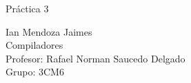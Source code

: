 \documentclass[12pt]{article}
\title{}
\author{Ian Mendoza Jaimes}
\date{}
\begin{document}
\begin{titlepage}
\centering
	\vspace*{1.5in}
	\begin{huge}
		Práctica 3\\
	\end{huge}
	\vspace{4em}
	\begin{Large}
		Ian Mendoza Jaimes \\
		\vspace{4em}
		Compiladores \\
		\vspace{1em}
		Profesor: Rafael Norman Saucedo Delgado \\
		\vspace{1em}
		Grupo: 3CM6 \\
		\vspace{1em}
	\end{Large}
\end{titlepage}

\tableofcontents
{}
\pagebreak



\newpage



\newpage



\newpage



\vspace{3em}



\end{document}
